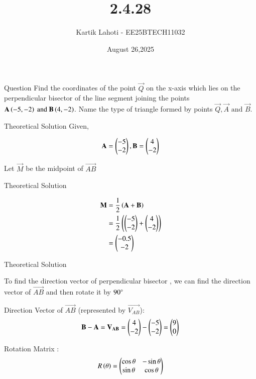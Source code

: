 \documentclass{beamer}
\title %
{2.4.28}
\date{August 26,2025}
\author 
{Kartik Lahoti - EE25BTECH11032}
\begin{document}
\frame{\titlepage}
\begin{frame}{Question}
Find the coordinates of the point $\vec{Q}$ on the x-axis which lies on the perpendicular bisector of the line segment joining the points $\mathbf{A} \left(-5,-2\right) \text{ and } \mathbf{B} \left(4,-2\right)$. Name the type of triangle formed by points $\vec{Q}, \vec{A} \text{ and } \vec{B}$.
\end{frame}



\begin{frame}{Theoretical Solution}
Given,

\begin{align}
    \mathbf{A} = \begin{pmatrix}-5\\-2\end{pmatrix} , \mathbf{B} = \begin{pmatrix}4\\-2\end{pmatrix}      
\end{align}

Let $\vec{M}$ be the midpoint of $\vec{AB}$

\end{frame}

\begin{frame}{Theoretical Solution}

\begin{align}
    \mathbf{M} &= \frac{1}{2}\left(\mathbf{A} + \mathbf{B}\right)\\
     &= \frac{1}{2}\left(\begin{pmatrix}-5\\-2\end{pmatrix} + \begin{pmatrix}4\\-2\end{pmatrix}\right)\\
     &= \begin{pmatrix}-0.5 \\ -2\end{pmatrix}
\end{align}

\end{frame}

\begin{frame}{Theoretical Solution}

To find the direction vector of perpendicular bisector , we can find the direction vector of $\vec{AB}$ and then rotate it by $90\degree$

Direction Vector of $\vec{AB}$ (represented by $\vec{V_{AB}}$): 
\begin{align}
    \mathbf{B} - \mathbf{A} = \mathbf{V_{AB}} = \begin{pmatrix}4\\-2\end{pmatrix} - \begin{pmatrix}-5\\-2\end{pmatrix} = \begin{pmatrix}9 \\ 0 \end{pmatrix}
\end{align}

Rotation Matrix : 
\begin{align}
    R\left(\theta\right) = \begin{pmatrix}\cos{\theta} & -\sin{\theta} \\ \sin{\theta} & \cos{\theta}\end{pmatrix}
\end{align}
\end{frame}
\end{document}
